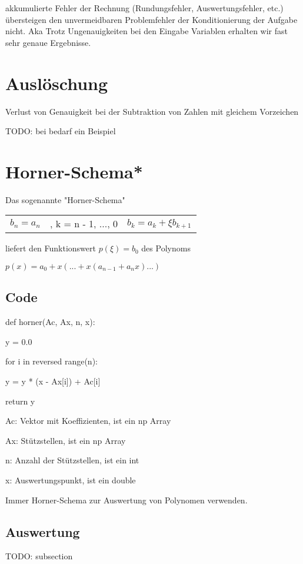 \documentclass[12pt,a4paper]{article} %
\newcommand*\tab[1][1cm]{\hspace*{#1}}
\begin{document}
	akkumulierte Fehler der Rechnung (Rundungsfehler, Auswertungsfehler, etc.) übersteigen den unvermeidbaren Problemfehler der Konditionierung der Aufgabe nicht. Aka Trotz Ungenauigkeiten bei den Eingabe Variablen erhalten wir fast sehr genaue Ergebnisse.
	
	\newpage
	
	\section{Auslöschung}
	
	Verlust von Genauigkeit bei der Subtraktion von Zahlen mit gleichem Vorzeichen
	
	TODO: bei bedarf ein Beispiel
	
	\newpage
	
	\section{Horner-Schema*}
	
	Das sogenannte "Horner-Schema"
	
	\begin{tabular}{l l l}
		$b_n = a_n$ &, k = n - 1, ..., 0 & $b_k = a_k + \xi b_{k + 1} $
	\end{tabular}
	liefert den Funktionswert $p(\xi) = b_0$ des Polynoms
	
	$p(x) = a_0 + x(... + x(a_{n-1} + a_nx)...)$
	
	\subsection{Code}
	
	def horner(Ac, Ax, n, x): 
	
	y = 0.0
	
	for i in reversed range(n):
	
	\tab y = y * (x - Ax[i]) + Ac[i]
 
	return y
	
	Ac: Vektor mit Koeffizienten, ist ein np Array
	
	Ax: Stützstellen, ist ein np Array
	
	n: Anzahl der Stützstellen, ist ein int
	
	x: Auswertungspunkt, ist ein double
	
	Immer Horner-Schema zur Auswertung von Polynomen verwenden.
	
	\subsection{Auswertung}
	TODO: subsection
	
\end{document}
